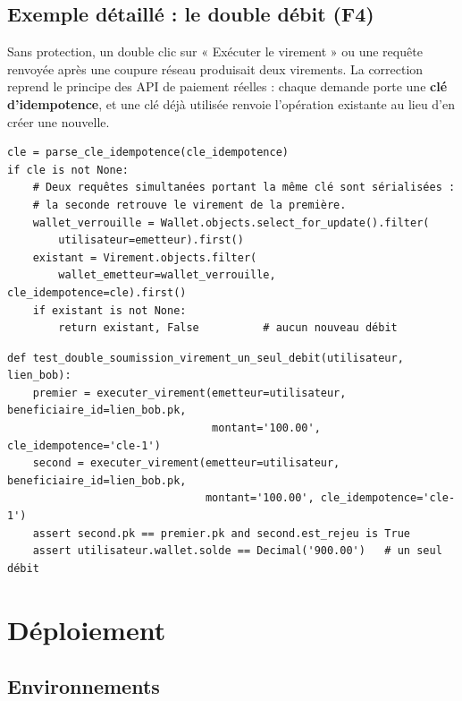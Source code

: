 \documentclass[11pt,a4paper]{report}
\begin{document}
\section{Exemple détaillé : le double débit (F4)}

Sans protection, un double clic sur « Exécuter le virement » ou une requête renvoyée
après une coupure réseau produisait deux virements. La correction reprend le principe
des API de paiement réelles : chaque demande porte une \textbf{clé d'idempotence}, et
une clé déjà utilisée renvoie l'opération existante au lieu d'en créer une nouvelle.

\begin{lstlisting}[caption={Virement idempotent : vérification de la clé sous verrou}]
cle = parse_cle_idempotence(cle_idempotence)
if cle is not None:
    # Deux requêtes simultanées portant la même clé sont sérialisées :
    # la seconde retrouve le virement de la première.
    wallet_verrouille = Wallet.objects.select_for_update().filter(
        utilisateur=emetteur).first()
    existant = Virement.objects.filter(
        wallet_emetteur=wallet_verrouille, cle_idempotence=cle).first()
    if existant is not None:
        return existant, False          # aucun nouveau débit
\end{lstlisting}

\begin{lstlisting}[caption={Test : deux soumissions, un seul débit}]
def test_double_soumission_virement_un_seul_debit(utilisateur, lien_bob):
    premier = executer_virement(emetteur=utilisateur, beneficiaire_id=lien_bob.pk,
                                montant='100.00', cle_idempotence='cle-1')
    second = executer_virement(emetteur=utilisateur, beneficiaire_id=lien_bob.pk,
                               montant='100.00', cle_idempotence='cle-1')
    assert second.pk == premier.pk and second.est_rejeu is True
    assert utilisateur.wallet.solde == Decimal('900.00')   # un seul débit
\end{lstlisting}

\chapter{Déploiement}

\section{Environnements}
\end{document}
